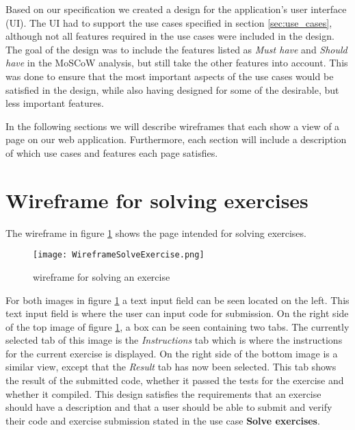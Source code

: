 Based on our specification we created a design for the application's user interface (UI). The UI had to support the use cases specified in section \ref*{sec:use_cases}, although not all features required in the use cases were included in the design. The goal of the design was to include the features listed as \textit{Must have} and \textit{Should have} in the MoSCoW analysis, but still take the other features into account. This was done to ensure that the most important aspects of the use cases would be satisfied in the design, while also having designed for some of the desirable, but less important features.

In the following sections we will describe wireframes that each show a view of a page on our web application. Furthermore, each section will include a description of which use cases and features each page satisfies.

\section{Wireframe for solving exercises}
The wireframe in figure \ref{fig:wfExercise} shows the page intended for solving exercises.
\begin{figure}[H]
	\texttt{[image: WireframeSolveExercise.png]}
	\centering
	\caption{wireframe for solving an exercise}
	\label{fig:wfExercise}
\end{figure}

For both images in figure \ref{fig:wfExercise} a text input field can be seen located on the left. This text input field is where the user can input code for submission. On the right side of the top image of figure \ref{fig:wfExercise}, a box can be seen containing two tabs. The currently selected tab of this image is the \textit{Instructions} tab which is where the instructions for the current exercise is displayed. On the right side of the bottom image is a similar view, except that the \textit{Result} tab has now been selected. This tab shows the result of the submitted code, whether it passed the tests for the exercise and whether it compiled. This design satisfies the requirements that an exercise should have a description and that a user should be able to submit and verify their code and exercise submission stated in the use case \textbf{Solve exercises}.

